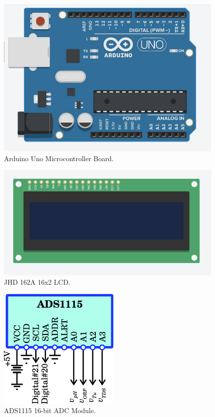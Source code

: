 \documentclass[conference]{IEEEtran}
\begin{document}
\begin{figure}[!h]
    \centering
    \includegraphics[width=0.7\columnwidth]{figs/arduino_uno.jpg}
    \caption{Arduino Uno Microcontroller Board.}
    \label{fig:arduino}
\end{figure}

\begin{figure}[!h]
    \centering
    \includegraphics[width=0.8\columnwidth]{figs/jhd162a_lcd.jpg}
    \caption{JHD 162A 16x2 LCD.}
    \label{fig:lcd}
\end{figure}

\begin{figure}[!h]
    \centering
    \includegraphics[width=0.5\columnwidth]{figs/ads1115_module.png}
    \caption{ADS1115 16-bit ADC Module.}
    \label{fig:ads1115}
\end{figure}
\end{document}
